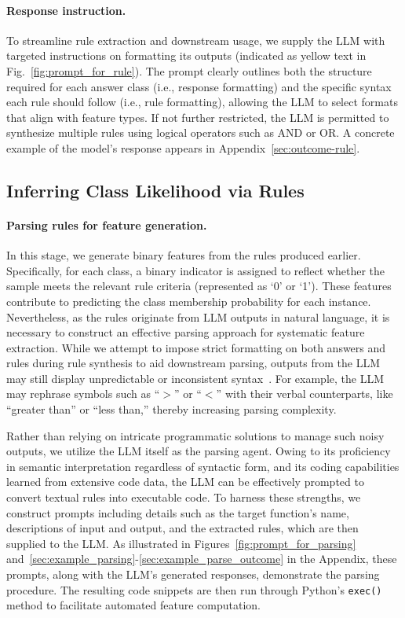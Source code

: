 \vspace*{-0.12in}
\paragraph{Response instruction.} To streamline rule extraction and downstream usage, we supply the LLM with targeted instructions on formatting its outputs (indicated as yellow text in Fig.~\ref{fig:prompt_for_rule}). The prompt clearly outlines both the structure required for each answer class (i.e., response formatting) and the specific syntax each rule should follow (i.e., rule formatting), allowing the LLM to select formats that align with feature types. If not further restricted, the LLM is permitted to synthesize multiple rules using logical operators such as AND or OR. A concrete example of the model's response appears in Appendix~\ref{sec:outcome-rule}.

\subsection{Inferring Class Likelihood via Rules}
\label{Sec:training}

\paragraph{Parsing rules for feature generation.} In this stage, we generate binary features from the rules produced earlier. Specifically, for each class, a binary indicator is assigned to reflect whether the sample meets the relevant rule criteria (represented as ‘0’ or ‘1’). These features contribute to predicting the class membership probability for each instance. Nevertheless, as the rules originate from LLM outputs in natural language, it is necessary to construct an effective parsing approach for systematic feature extraction. While we attempt to impose strict formatting on both answers and rules during rule synthesis to aid downstream parsing, outputs from the LLM may still display unpredictable or inconsistent syntax~\cite{kovavc2023large}. For example, the LLM may rephrase symbols such as “$>$” or “$<$” with their verbal counterparts, like “greater than” or “less than,” thereby increasing parsing complexity.

Rather than relying on intricate programmatic solutions to manage such noisy outputs, we utilize the LLM itself as the parsing agent. Owing to its proficiency in semantic interpretation regardless of syntactic form, and its coding capabilities learned from extensive code data, the LLM can be effectively prompted to convert textual rules into executable code. To harness these strengths, we construct prompts including details such as the target function’s name, descriptions of input and output, and the extracted rules, which are then supplied to the LLM. As illustrated in Figures~\ref{fig:prompt_for_parsing} and~\ref{sec:example_parsing}-\ref{sec:example_parse_outcome} in the Appendix, these prompts, along with the LLM’s generated responses, demonstrate the parsing procedure. The resulting code snippets are then run through Python’s \texttt{exec()} method to facilitate automated feature computation.


